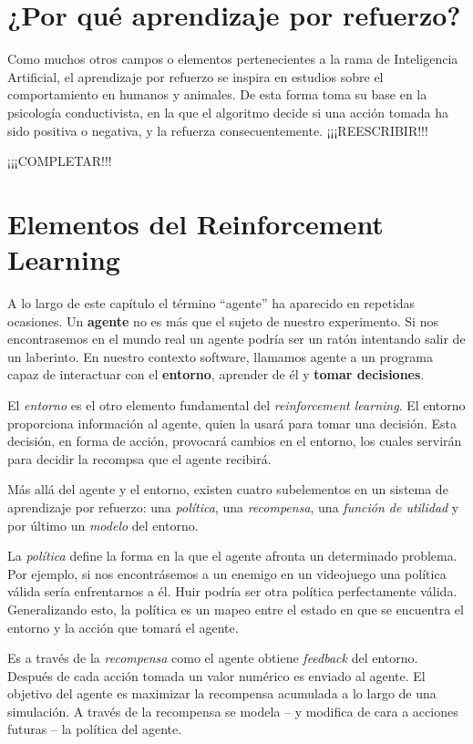\section{¿Por qué aprendizaje por refuerzo?}
Como muchos otros campos o elementos pertenecientes a la rama de Inteligencia Artificial, el aprendizaje por refuerzo se inspira en estudios sobre el comportamiento en humanos y animales. De esta forma toma su base en la psicología conductivista, en la que el algoritmo decide si una acción tomada ha sido positiva o negativa, y la refuerza consecuentemente. ¡¡¡REESCRIBIR!!!

¡¡¡COMPLETAR!!!

\section{Elementos del Reinforcement Learning}
A lo largo de este capítulo el término ``agente'' ha aparecido en repetidas ocasiones. Un \textbf{agente} no es más que el sujeto de nuestro experimento. Si nos encontrasemos en el mundo real un agente podría ser un ratón intentando salir de un laberinto. En nuestro contexto software, llamamos agente a un programa capaz de interactuar con el \textbf{entorno}, aprender de él y \textbf{tomar decisiones}.

El \textit{entorno} es el otro elemento fundamental del \textit{reinforcement learning}. El entorno proporciona información al agente, quien la usará para tomar una decisión. Esta decisión, en forma de acción, provocará cambios en el entorno, los cuales servirán para decidir la recompsa que el agente recibirá.

Más allá del agente y el entorno, existen cuatro subelementos en un sistema de aprendizaje por refuerzo: una \textit{política}, una \textit{recompensa}, una \textit{función de utilidad} y por último un \textit{modelo} del entorno.

La \textit{política} define la forma en la que el agente afronta un determinado problema. Por ejemplo, si nos encontrásemos a un enemigo en un videojuego una política válida sería enfrentarnos a él. Huir podría ser otra política perfectamente válida. Generalizando esto, la política es un mapeo entre el estado en que se encuentra el entorno y la acción que tomará el agente.

Es a través de la \textit{recompensa} como el agente obtiene \textit{feedback} del entorno. Después de cada acción tomada un valor numérico es enviado al agente. El objetivo del agente es maximizar la recompensa acumulada a lo largo de una simulación. A través de la recompensa se modela – y modifica de cara a acciones futuras – la política del agente.

